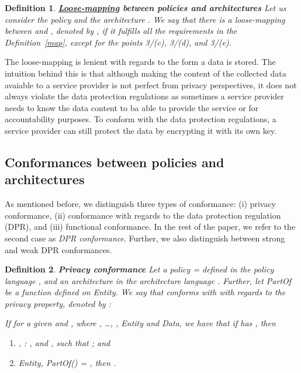 \documentclass[a4paper]{article}
\newtheorem{ttd}{Definition}
\begin{document}
\begin{ttd} \textbf{\underline{Loose-mapping} between policies and architectures}
\label{maploose} 
Let us consider the policy  and the architecture . We say that there is a loose-mapping between  and , denoted by   , if it fulfills all the requirements in the Definition~\ref{map}, except for the points 3/(c), 3/(d), and 3/(e). 

\end{ttd}  

The loose-mapping is lenient with regards to the form a data is stored. The intuition behind this is that although making the content of the collected data avaiable to a service provider is not perfect from privacy perspectives,  it does not always violate the data protection regulations as sometimes a service provider needs to know the data content to ba able to provide the service or for accountability purposes. To conform with the data protection regulations, a service provider can still protect the data by encrypting it with its own key.  

\subsection{Conformances between policies and architectures}
\label{conformances}

As mentioned before, we distinguish three types of conformance: (i) privacy conformance, (ii) conformance with regards to the data protection regulation (DPR), and (iii) functional conformance. In the rest of the paper, we refer to the second case as \textit{DPR conformance}. Further, we also distinguish between strong and weak DPR conformances. 

\begin{ttd} \textbf{Privacy conformance}
Let a policy  =  defined in the policy language , and an   
architecture  in the architecture language . Further, let \textit{PartOf} be a function defined on \textit{Entity}.  We say that  conforms with  with regards to the privacy property, denoted by    :

If for a given  and , where   , \dots, ,   \textit{Entity} and   \textit{Data},  we have that if  has , then 
\begin{enumerate}
\item  , :   ,  and    , such that   ; and 

\item    \textit{Entity},    \textit{PartOf}() = ,     then   .
\end{enumerate}

\end{ttd} 
\end{document}
